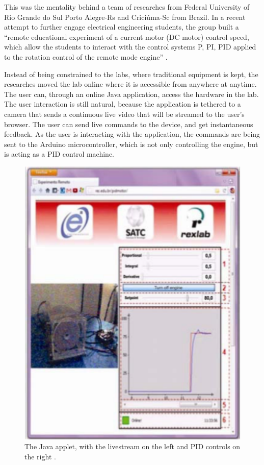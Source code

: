 \documentclass[11pt,letterpaper,twocolumn]{article}
\begin{document}
This was the mentality behind a team of researches from Federal University of Rio Grande do Sul Porto Alegre-Rs and Criciúma-Sc  from Brazil. In a recent attempt to further engage electrical engineering students, the group built a ``remote educational experiment of a current motor (DC motor) control speed, which allow the students to interact with the control systems P, PI, PID applied to the rotation control of the remote mode engine'' \cite{engineering}.

Instead of being constrained to the labs, where traditional equipment is kept, the researches moved the lab online where it is accessible from anywhere at anytime. The user can, through an online Java application, access the hardware in the lab. The user interaction is still natural, because the application is tethered to a camera that sends a continuous live video that will be streamed to the user's browser. The user can send live commands to the device, and get instantaneous feedback. As the user is interacting with the application, the commands are being sent to the Arduino microcontroller, which is not only controlling the engine, but is acting as a PID control machine.

\begin{figure}[!ht]
    \centering
    \includegraphics[width=.90\columnwidth]{pid-controller.pdf}
    \caption{The Java applet, with the livestream on the left and PID controls on the right \cite{engineering}.}
\end{figure}
\end{document}
